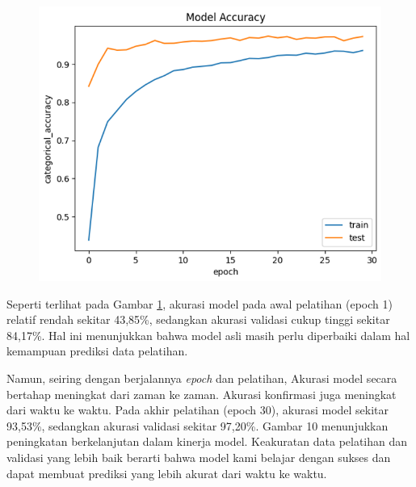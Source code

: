 \begin{figure}[!hbt]
	\centering
	\includegraphics[width=0.7\linewidth]{gambar/bener/Accuracy_ModelCNN2.png}
	\label{fig:AkurasiCNNKedua}
\end{figure}

Seperti terlihat pada Gambar \ref{fig:AkurasiCNNKedua}, akurasi model pada awal pelatihan (epoch 1) relatif rendah sekitar 43,85\%, sedangkan akurasi validasi cukup tinggi sekitar 84,17\%. Hal ini menunjukkan bahwa model asli masih perlu diperbaiki dalam hal kemampuan prediksi data pelatihan.

Namun, seiring dengan berjalannya\textit{ epoch} dan pelatihan, Akurasi model secara bertahap meningkat dari zaman ke zaman. Akurasi konfirmasi juga meningkat dari waktu ke waktu. Pada akhir pelatihan (epoch 30), akurasi model sekitar 93,53\%, sedangkan akurasi validasi sekitar 97,20\%. Gambar 10 menunjukkan peningkatan berkelanjutan dalam kinerja model. Keakuratan data pelatihan dan validasi yang lebih baik berarti bahwa model kami belajar dengan sukses dan dapat membuat prediksi yang lebih akurat dari waktu ke waktu. 	


